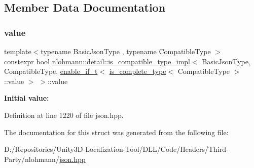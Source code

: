 \subsection{Member Data Documentation}
\mbox{\label{structnlohmann_1_1detail_1_1is__compatible__type__impl_3_01_basic_json_type_00_01_compatible_typ632bee7ec037fc0233f1bbe9dd7d8874_a1e4cacef2d41bdc682a1e2946edb0a41}} 
\subsubsection{\texorpdfstring{value}{value}}
{\footnotesize\ttfamily template$<$typename Basic\+Json\+Type , typename Compatible\+Type $>$ \\
constexpr bool \mbox{\hyperlink{structnlohmann_1_1detail_1_1is__compatible__type__impl}{nlohmann\+::detail\+::is\+\_\+compatible\+\_\+type\+\_\+impl}}$<$ Basic\+Json\+Type, Compatible\+Type, \mbox{\hyperlink{namespacenlohmann_1_1detail_a02bcbc878bee413f25b985ada771aa9c}{enable\+\_\+if\+\_\+t}}$<$ \mbox{\hyperlink{structnlohmann_1_1detail_1_1is__complete__type}{is\+\_\+complete\+\_\+type}}$<$ Compatible\+Type $>$\+::value $>$ $>$\+::value\hspace{0.3cm}{\ttfamily [static]}}

{\bfseries Initial value\+:}
\begin{DoxyCode}{0}
\DoxyCodeLine{=}

\end{DoxyCode}


Definition at line 1220 of file json.\+hpp.



The documentation for this struct was generated from the following file\+:\begin{DoxyCompactItemize}
\item 
D\+:/\+Repositories/\+Unity3\+D-\/\+Localization-\/\+Tool/\+D\+L\+L/\+Code/\+Headers/\+Third-\/\+Party/nlohmann/\mbox{\hyperlink{json_8hpp}{json.\+hpp}}\end{DoxyCompactItemize}
